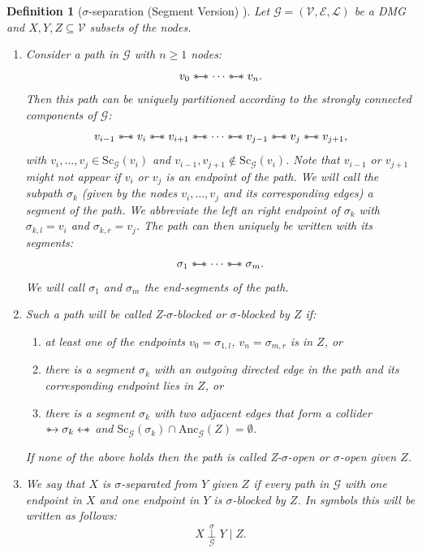 \documentclass[accepted]{uai2025} %
\newtheorem{definition}{Definition}
\newcommand{\anc}{\text{Anc}}
\newcommand{\hus}{\mathrel{{\leftarrow\mkern-11mu\ast}}}
\newcommand{\suh}{\mathrel{{\ast\mkern-11mu\to}}}
\newcommand{\sus}{\mathrel{{\ast\mkern-11mu\relbar\mkern-9mu\relbar\mkern-11mu\ast}}}
\begin{document}
\begin{definition}[$\sigma$-separation (Segment Version) \citep{forre2017markov}] \label{segmentsigma}
Let $\mathcal{G}=(\mathcal{V},\mathcal{E},\mathcal{L})$ be a DMG and $X,Y,Z\subseteq \mathcal{V}$ subsets of the nodes.
\begin{enumerate}
    \item Consider a path in $\mathcal{G}$ with $n\geq1$ nodes:
    $$
    v_0\sus\cdots\sus v_n.
    $$
    Then this path can be uniquely partitioned according to the strongly connected components of $\mathcal{G}$:
    $$
    v_{i-1}\sus v_i\sus v_{i+1}\sus\cdots\sus v_{j-1}\sus v_j\sus v_{j+1},
    $$
    with $v_i,\ldots, v_j\in \text{Sc}_\mathcal{G}(v_i)$ and $v_{i-1},v_{j+1}\notin \text{Sc}_\mathcal{G}(v_i)$. Note that $v_{i-1}$ or $v_{j+1}$ might not appear if $v_i$ or $v_j$ is an endpoint of the path. We will call the subpath $\sigma_k$ (given by the nodes $v_i,\ldots,v_j$ and its corresponding edges) a segment of the path. We abbreviate the left an right endpoint of $\sigma_k$ with $\sigma_{k,l}=v_i$ and $\sigma_{k,r}=v_j$. The path can then uniquely be written with its segments:
    $$
    \sigma_1\sus\cdots\sus\sigma_m.
    $$
    We will call $\sigma_1$ and $\sigma_m$ the end-segments of the path.
    \item Such a path will be called \emph{Z-$\sigma$-blocked} or \emph{$\sigma$-blocked by $Z$} if:
    \begin{enumerate}
        \item at least one of the endpoints $v_0=\sigma_{1,l}$, $v_n=\sigma_{m,r}$ is in $Z$, or 
        \item there is a segment $\sigma_k$ with an outgoing directed edge in the path and its corresponding endpoint lies in $Z$, or
        \item there is a segment $\sigma_k$ with two adjacent edges that form a collider $\suh\sigma_k\hus$ and $\text{Sc}_\mathcal{G}(\sigma_k)\cap\anc_\mathcal{G}(Z)=\emptyset$.
    \end{enumerate}
    If none of the above holds then the path is called \emph{Z-$\sigma$-open} or \emph{$\sigma$-open given $Z$}.
    \item We say that $X$ is $\sigma$-separated from $Y$ given $Z$ if every path in $\mathcal{G}$ with one endpoint in $X$ and one endpoint in $Y$ is $\sigma$-blocked by $Z$. In symbols this will be written as follows:
    $$
    X\overset{\sigma}{\underset{\mathcal{G}}{\perp}} Y\mid Z.
    $$
\end{enumerate}
\end{definition}
\end{document}
